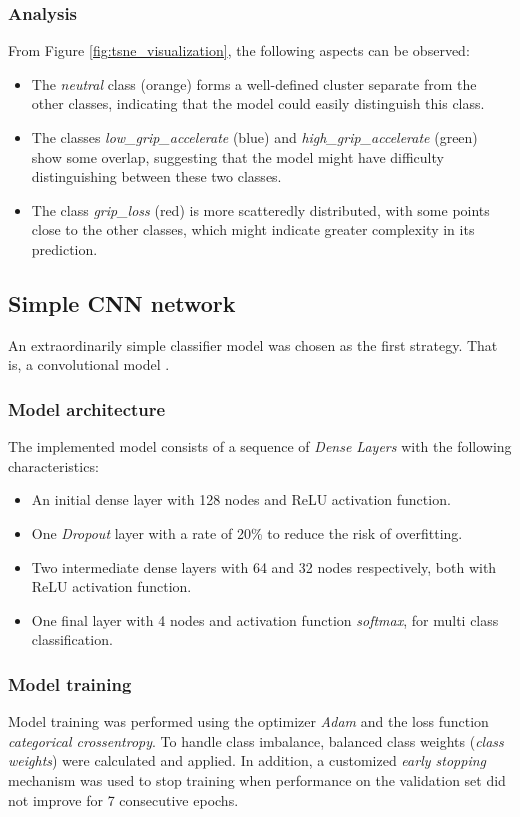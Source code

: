 \documentclass[a4paper,final,12pt]{report}
\begin{document}
\subsubsection{Analysis}
From Figure \ref{fig:tsne_visualization}, the following aspects can be observed:
\begin{itemize}
    \item The \textit{neutral} class (orange) forms a well-defined cluster separate from the other classes, indicating that the model could easily distinguish this class.
    \item The classes \textit{low\_grip\_accelerate} (blue) and \textit{high\_grip\_accelerate} (green) show some overlap, suggesting that the model might have difficulty distinguishing between these two classes.
    \item The class \textit{grip\_loss} (red) is more scatteredly distributed, with some points close to the other classes, which might indicate greater complexity in its prediction.
\end{itemize}

\subsection{Simple CNN network}
An extraordinarily simple classifier model was chosen as the first strategy. That is, a convolutional model \cite{lecun1998gradient}.

\subsubsection{Model architecture}
The implemented model consists of a sequence of \textit{Dense Layers} with the following characteristics:
\begin{itemize}
    \item An initial dense layer with 128 nodes and ReLU activation function.
    \item One \textit{Dropout} layer with a rate of 20\% to reduce the risk of overfitting.
    \item Two intermediate dense layers with 64 and 32 nodes respectively, both with ReLU activation function.
    \item One final layer with 4 nodes and activation function \textit{softmax}, for multi class classification.
\end{itemize}

\subsubsection{Model training}
Model training was performed using the optimizer \textit{Adam} and the loss function \textit{categorical crossentropy}. To handle class imbalance, balanced class weights (\textit{class weights}) were calculated and applied. In addition, a customized \textit{early stopping} mechanism was used to stop training when performance on the validation set did not improve for 7 consecutive epochs.
\end{document}
